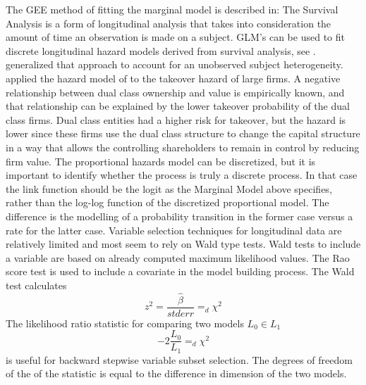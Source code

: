 The GEE method of fitting the marginal model is described in: \cite{Liang, K-Y and Zeger, S. L.(1986)}  The Survival Analysis is a form of longitudinal analysis that takes into consideration the amount of time an observation is made on a subject.  GLM's can be used to fit discrete longitudinal hazard models derived from survival analysis, see  \cite{Prentice and Gloeckler (1978)}.   \cite{Meyer, B.D. (1990)} generalized that approach to account for an unobserved subject heterogeneity.  \cite{Holmen, M (2005)} applied the hazard model of \cite{Prentice, R. and L. Gloeckler (1978)} to the takeover hazard of large firms.  A negative relationship between dual class ownership and value is empirically known, and that relationship can be explained by the lower takeover probability of the dual class firms.  Dual class entities had a higher risk for takeover, but the hazard is lower since these firms use the dual class structure to change the capital structure in a way that allows the controlling shareholders to remain in control by reducing firm value.  The proportional hazards model can be discretized, but it is important to identify whether the process is truly a discrete process.  In that case the link function should be the logit as the Marginal Model above specifies, rather than the log-log function of the discretized proportional model.  The difference is the modelling of a probability transition in the former case versus a rate for the latter case.  Variable selection techniques for longitudinal data are relatively limited and most seem to rely on Wald type tests. Wald tests to include a variable are based on already computed maximum likelihood values. The Rao score test is used to include a covariate in the model building process.  The Wald test calculates \[z^2=\frac{\widehat{\beta}}{stderr}=_d  \chi^2\]  The likelihood ratio statistic for comparing two models $L_0 \in L_1$ \[-2 \frac{L_0}{L_1} =_d \chi^2\] is useful for backward stepwise variable subset selection. The degrees of freedom of the of the statistic is equal to the difference in dimension of the two models.


